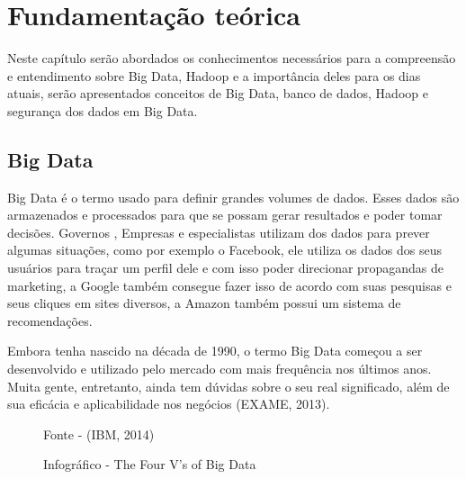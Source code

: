 \chapter{Fundamentação teórica}
\label{CAP2}

Neste capítulo serão abordados os conhecimentos necessários para a compreensão e entendimento sobre Big Data, Hadoop e a importância deles para os dias atuais, serão apresentados conceitos de Big Data, banco de dados, Hadoop e segurança dos dados em Big Data.

\section{Big Data}
\label{BigData}

Big Data é o termo usado para definir grandes volumes de dados. Esses dados são armazenados e processados para que se possam gerar resultados e poder tomar decisões. Governos , Empresas e especialistas utilizam dos dados para prever algumas situações, como por exemplo o Facebook, ele utiliza os dados dos seus usuários para traçar um perfil dele e com isso poder direcionar propagandas de marketing, a Google também consegue fazer isso de acordo com suas pesquisas e seus cliques em sites diversos, a Amazon também possui um sistema de recomendações.

Embora tenha nascido na década de 1990, o termo Big Data começou a ser desenvolvido e utilizado pelo mercado com mais frequência nos últimos anos. Muita gente, entretanto, ainda tem dúvidas sobre o seu real significado, além de sua eficácia e aplicabilidade nos negócios (EXAME, 2013).

\begin{figure}[htbp!] 
	\begin{center}
		\caption{Infográfico - The Four V's of Big Data}
		\small{Fonte - (IBM, 2014)}
		\label{Fig:4-Vs-IBM}
	\end{center} 
\end{figure}


